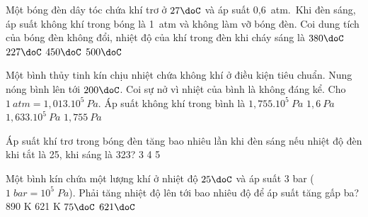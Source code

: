 \begin{vidu} %
	Một bóng đèn dây tóc chứa khí trơ ở $27\doC$ và áp suất 0,6\ atm.\ Khi đèn sáng, áp suất không khí trong bóng là 1\ atm và không làm vỡ bóng đèn. Coi dung tích của bóng đèn không đổi, nhiệt độ của khí trong đèn khi cháy sáng là
	\choice
	{$380\doC$}
	{\True $227\doC$}
	{$450\doC$}
	{$500\doC$}
	
\end{vidu}
\begin{vidu} %
	Một bình thủy tinh kín chịu nhiệt chứa không khí ở điều kiện tiêu chuẩn. Nung nóng bình lên tới $200\doC$. Coi sự nở vì nhiệt của bình là không đáng kể. Cho $1\ atm = 1,013.10^5\ Pa$. Áp suất không khí trong bình là
	\choice
	{\True $1,755.10^5\ Pa$}
	{$1,6\ Pa$}
	{$1,633.10^5\ Pa$}
	{$1,755\ Pa$}
\end{vidu}
\begin{vidu}%
	Áp suất khí trơ trong bóng đèn tăng bao nhiêu lần khi đèn sáng nếu nhiệt độ đèn khi tắt là 25\doC, khi sáng là 323\doC?
	\choice
	{}
	{3}
	{4}
	{5}
\end{vidu}
\begin{vidu}%
	Một bình kín chứa một lượng khí ở nhiệt độ $25\doC$ và áp suất 3 bar ($1\;bar = 10^5\;Pa$). Phải tăng nhiệt độ lên tới bao nhiêu độ để áp suất tăng gấp ba?
	\choice
	{890 K}
	{621 K}
	{$75\doC$}
	{\True $621\doC$}
\end{vidu}
